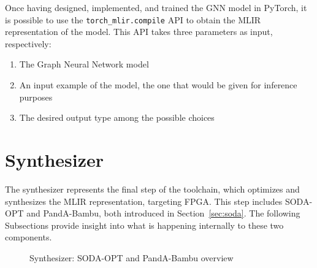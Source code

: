 Once having designed, implemented, and trained the GNN model in PyTorch, it is possible to use the \texttt{torch\_mlir.compile} API to obtain the MLIR representation of the model.
This API takes three parameters as input, respectively:
\begin{enumerate}
    \item The Graph Neural Network model
    \item An input example of the model, the one that would be given for inference purposes
    \item The desired output type among the possible choices
\end{enumerate}

\section{Synthesizer}
\label{sec:toolchain-synthesizer}%

The synthesizer represents the final step of the toolchain, which optimizes and synthesizes the MLIR representation, targeting FPGA\@.
This step includes SODA-OPT and PandA-Bambu, both introduced in Section~\ref{sec:soda}.
The following Subsections provide insight into what is happening internally to these two components.

\begin{figure}[t]
    \centering
    \hspace{0.03\textwidth}
    \caption{Synthesizer: SODA-OPT and PandA-Bambu overview~\cite{9786533}}
    \label{fig:synthesizer_flow}
\end{figure}

